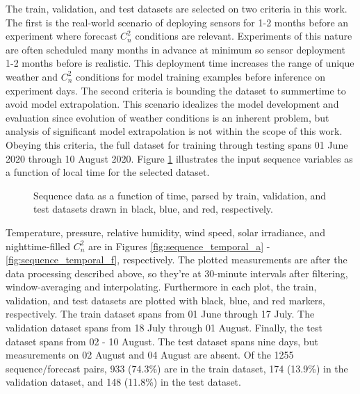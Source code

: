 The train, validation, and test datasets are selected on two criteria in this work. The first is the real-world scenario of deploying sensors for 1-2 months before an experiment where forecast $C_{n}^{2}$ conditions are relevant. Experiments of this nature are often scheduled many months in advance at minimum so sensor deployment 1-2 months before is realistic. This deployment time increases the range of unique weather and $C_{n}^{2}$ conditions for model training examples before inference on experiment days. The second criteria is bounding the dataset to summertime to avoid model extrapolation. This scenario idealizes the model development and evaluation since evolution of weather conditions is an inherent problem, but analysis of significant model extrapolation is not within the scope of this work. Obeying this criteria, the full dataset for training through testing spans 01 June 2020 through 10 August 2020. Figure \ref{fig:sequence_temporal} illustrates the input sequence variables as a function of local time for the selected dataset.
\label{sec:wx_seq_hist}
\begin{figure}[p!]
	\centering
	\hfill
	\hfill
	\hfill
	\caption{Sequence data as a function of time, parsed by train, validation, and test datasets drawn in black, blue, and red, respectively.}
	\label{fig:sequence_temporal}
\end{figure}
Temperature, pressure, relative humidity, wind speed, solar irradiance, and nighttime-filled $C_{n}^{2}$ are in Figures \ref{fig:sequence_temporal_a} - \ref{fig:sequence_temporal_f}, respectively. The plotted measurements are after the data processing described above, so they're at 30-minute intervals after filtering, window-averaging and interpolating. Furthermore in each plot, the train, validation, and test datasets are plotted with black, blue, and red markers, respectively. The train dataset spans from 01 June through 17 July. The validation dataset spans from 18 July through 01 August. Finally, the test dataset spans from 02 - 10 August. The test dataset spans nine days, but measurements on 02 August and 04 August are absent. Of the 1255 sequence/forecast pairs, 933 (74.3\%) are in the train dataset, 174 (13.9\%) in the validation dataset, and 148 (11.8\%) in the test dataset.

